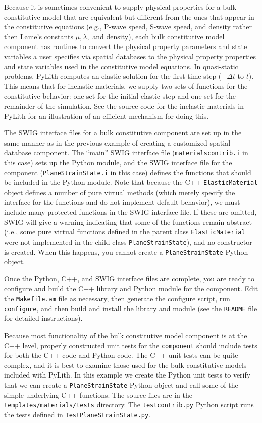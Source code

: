 Because it is sometimes convenient to supply physical properties for
a bulk constitutive model that are equivalent but different from the
ones that appear in the constitutive equations (e.g., P-wave speed,
S-wave speed, and density rather then Lame's constants $\mu,$$\lambda,$
and density), each bulk constitutive model component has routines
to convert the physical property parameters and state variables a
user specifies via spatial databases to the physical property properties
and state variables used in the constitutive model equations. In quasi-static
problems, PyLith computes an elastic solution for the first time step
($-\Delta t$ to $t$). This means that for inelastic materials, we
supply two sets of functions for the constitutive behavior: one set
for the initial elastic step and one set for the remainder of the
simulation. See the source code for the inelastic materials in PyLith
for an illustration of an efficient mechanism for doing this.

The SWIG interface files for a bulk constitutive component are set
up in the same manner as in the previous example of creating a customized
spatial database component. The ``main'' SWIG interface file (\texttt{materialscontrib.i}
in this case) sets up the Python module, and the SWIG interface file
for the component (\texttt{PlaneStrainState.i} in this case) defines
the functions that should be included in the Python module. Note that
because the C++ \texttt{ElasticMaterial} object defines a number of
pure virtual methods (which merely specify the interface for the functions
and do not implement default behavior), we must include many protected
functions in the SWIG interface file. If these are omitted, SWIG will
give a warning indicating that some of the functions remain abstract
(i.e., some pure virtual functions defined in the parent class \texttt{ElasticMaterial}
were not implemented in the child class \texttt{PlaneStrainState}),
and no constructor is created. When this happens, you cannot create
a \texttt{PlaneStrainState} Python object.

Once the Python, C++, and SWIG interface files are complete, you are
ready to configure and build the C++ library and Python module for
the component. Edit the \texttt{Makefile.am} file as necessary, then
generate the configure script, run \texttt{configure}, and then build
and install the library and module (see the \texttt{README} file for
detailed instructions).

Because most functionality of the bulk constitutive model component
is at the C++ level, properly constructed unit tests for the \texttt{component}
should include tests for both the C++ code and Python code. The C++
unit tests can be quite complex, and it is best to examine those used
for the bulk constitutive models included with PyLith. In this example
we create the Python unit tests to verify that we can create a \texttt{PlaneStrainState}
Python object and call some of the simple underlying C++ functions.
The source files are in the \texttt{templates/materials/tests} directory.
The \texttt{testcontrib.py} Python script runs the tests defined in
\texttt{TestPlaneStrainState.py}.

